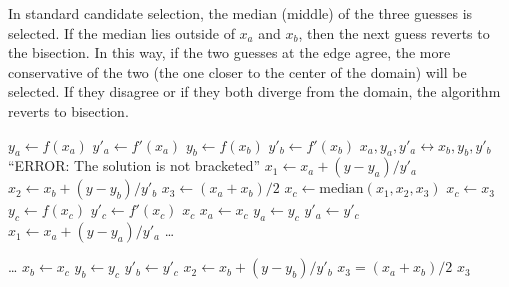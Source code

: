 In standard candidate selection, the median (middle) of the three guesses is selected.  If the median lies outside of $x_a$ and $x_b$, then the next guess reverts to the bisection.  In this way, if the two guesses at the edge agree, the more conservative of the two (the one closer to the center of the domain) will be selected.  If they disagree or if they both diverge from the domain, the algorithm reverts to bisection.

\begin{algorithm}
\caption{HYBRID1: Hybrid bisection and Newton iteration}\label{alg:hybrid1}
\begin{algorithmic}
\State $y_a \gets f(x_a)$   
\State $y'_a \gets f'(x_a)$
\State $y_b \gets f(x_b)$
\State $y'_b \gets f'(x_b)$
    \State $x_a,y_a,y'_a \leftrightarrow x_b,y_b,y'_b$  
\EndIf
{}
    \State \Return ``ERROR: The solution is not bracketed''
\EndIf
\State $x_1 \gets x_a + (y-y_a)/y'_a$   
\State $x_2 \gets x_b + (y-y_b)/y'_b$
\State $x_3 \gets (x_a + x_b)/2$
     
    \State $x_c \gets \mathrm{median}(x_1,x_2,x_3)$ 
     
        \State $x_c \gets x_3$ 
    \EndIf
    \State $y_c \gets f(x_c)$ 
    \State $y'_c\gets f'(x_c)$ 
     
        \State \Return $x_c$
    \EndIf
     
        \State $x_a \gets x_c$ 
        \State $y_a \gets y_c$
        \State $y'_a \gets y'_c$
        \State $x_1 \gets x_a + (y - y_a)/y'_a$ 
        \State \ldots
{}
\end{algorithmic}
\end{algorithm}

\begin{algorithm}
\caption{HYBRID1: Hybrid bisection continued}
\begin{algorithmic}
        \State \ldots
    \Else {}
        \State $x_b \gets x_c$ 
        \State $y_b \gets y_c$
        \State $y'_b \gets y'_c$
        \State $x_2 \gets x_b + (y - y_b)/y'_b$ 
    \EndIf
    \State $x_3 = (x_a + x_b)/2$    
\EndWhile
\State \Return $x_3$    
\EndProcedure
\end{algorithmic}
\end{algorithm}

